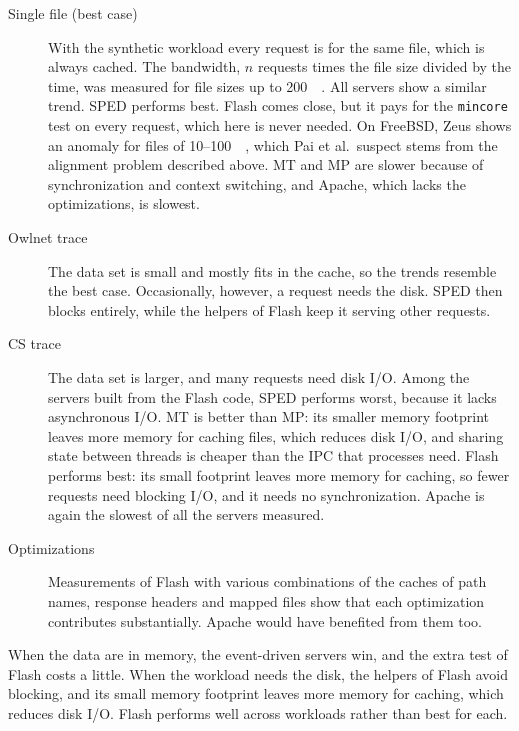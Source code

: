 \documentclass[../main.tex]{subfiles}
\begin{document}
\begin{description}
  \item[Single file (best case)] With the synthetic workload every request
    is for the same file, which is always cached.  The bandwidth, $n$
    requests times the file size divided by the time, was measured for file
    sizes up to \SI{200}{\kilo\byte}.  All servers show a similar trend.
    SPED performs best.  Flash comes close, but it pays for the
    \texttt{mincore} test on every request, which here is never needed.
    On FreeBSD, Zeus shows an anomaly for files of 10--\SI{100}{\kilo\byte},
    which Pai et al.\ suspect stems from the alignment problem described
    above.  MT and MP are slower because of
    synchronization and context switching, and Apache, which lacks the
    optimizations, is slowest.
  \item[Owlnet trace] The data set is small and mostly fits in the cache,
    so the trends resemble the best case.  Occasionally, however, a request
    needs the disk.  SPED then blocks entirely, while the helpers of Flash
    keep it serving other requests.
  \item[CS trace] The data set is larger, and many requests need disk I/O.
    Among the servers built from the Flash code, SPED performs worst,
    because it lacks asynchronous I/O.  MT is better than MP: its smaller
    memory footprint leaves more memory for caching files, which reduces
    disk I/O, and sharing state between threads is cheaper than the IPC that
    processes need.  Flash performs best: its small footprint leaves more
    memory for caching, so fewer requests need blocking I/O, and it needs no
    synchronization.  Apache is again the slowest of all the servers
    measured.
  \item[Optimizations] Measurements of Flash with various combinations of
    the caches of path names, response headers and mapped files show that
    each optimization contributes substantially.  Apache would have
    benefited from them too.
\end{description}

\begin{keypoint}
  When the data are in memory, the event-driven servers win, and the extra
  test of Flash costs a little.  When the workload needs the disk, the
  helpers of Flash avoid blocking, and its small memory footprint leaves
  more memory for caching, which reduces disk I/O.  Flash performs well
  across workloads rather than best for each.
\end{keypoint}
\end{document}
